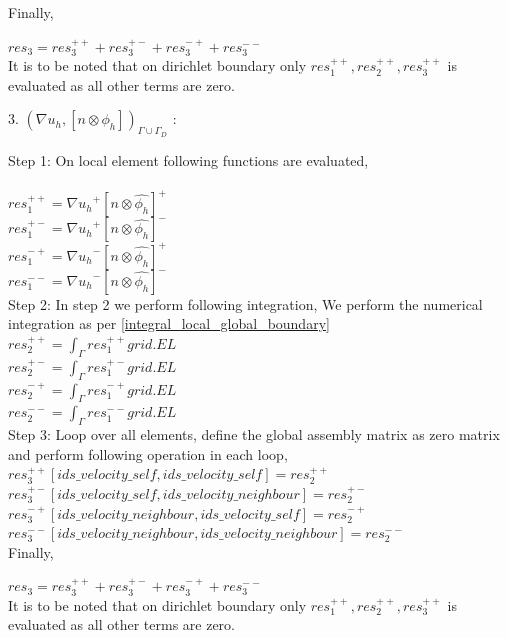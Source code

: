 \documentclass[a4paper,12pt]{book}
\begin{document}
Finally,

$res_3 = res_3^{++} + res_3^{+-} + res_3^{-+} + res_3^{--}$\\

It is to be noted that on dirichlet boundary only $res_1^{++}, res_2^{++}, res_3^{++}$ is evaluated as all other terms are zero.

3. $({\nabla u_h}, [n \otimes \phi_h])_{\Gamma \cup \Gamma_D}$ :

Step 1: On local element following functions are evaluated,\\
\\
$res_1^{++} = {\nabla u_h}^+ [n \otimes \hat{\phi_h}]^+$\\
$res_1^{+-} = {\nabla u_h}^+ [n \otimes \hat{\phi_h}]^-$\\
$res_1^{-+} = {\nabla u_h}^- [n \otimes \hat{\phi_h}]^+$\\
$res_1^{--} = {\nabla u_h}^- [n \otimes \hat{\phi_h}]^-$\\

Step 2: In step 2 we perform following integration, 
We perform the numerical integration as per \ref{integral_local_global_boundary}
\\ 
$res_2^{++} = \int_{\Gamma} res_1^{++} grid.EL$\\
$res_2^{+-} = \int_{\Gamma} res_1^{+-} grid.EL$\\
$res_2^{-+} = \int_{\Gamma} res_1^{-+} grid.EL$\\
$res_2^{--} = \int_{\Gamma} res_1^{--} grid.EL$\\

Step 3: Loop over all elements, define the global assembly matrix as zero matrix and perform following operation in each loop,
\\
$res_3^{++}[ids\_velocity\_self,ids\_velocity\_self] = res_2^{++}$\\
$res_3^{+-}[ids\_velocity\_self,ids\_velocity\_neighbour] = res_2^{+-}$\\
$res_3^{-+}[ids\_velocity\_neighbour,ids\_velocity\_self] = res_2^{-+}$\\
$res_3^{--}[ids\_velocity\_neighbour,ids\_velocity\_neighbour] = res_2^{--}$\\

Finally,

$res_3 = res_3^{++} + res_3^{+-} + res_3^{-+} + res_3^{--}$\\

It is to be noted that on dirichlet boundary only $res_1^{++}, res_2^{++}, res_3^{++}$ is evaluated as all other terms are zero.
\end{document}
